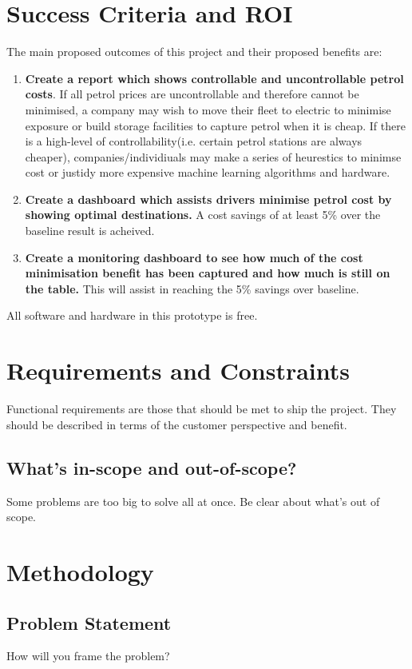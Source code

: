\documentclass[10pt]{article} %
\begin{document}
\section{Success Criteria and ROI}
The main proposed outcomes of this project and their proposed benefits are:
\begin{enumerate}
\item \textbf{Create a report which shows controllable and uncontrollable petrol costs}. If all petrol prices are uncontrollable and therefore cannot be minimised, a company may wish to move their fleet to electric to minimise exposure or build storage facilities to capture petrol when it is cheap. If there is a high-level of controllability(i.e. certain petrol stations are always cheaper), companies/individiuals may make a series of heurestics to minimse cost or justidy more expensive machine learning algorithms and hardware.
\item \textbf{Create a dashboard which assists drivers minimise petrol cost by showing optimal destinations.} A cost savings of at least 5\% over the baseline result is acheived.
\item \textbf{Create a monitoring dashboard to see how much of the cost minimisation benefit has been captured and how much is still on the table.} This will assist in reaching the 5\% savings over  baseline.
\end{enumerate}
All software and hardware in this prototype is free. 

\section{ Requirements and Constraints}
Functional requirements are those that should be met to ship the project. They should be described in terms of the customer perspective and benefit.
\subsection{What's in-scope and out-of-scope?}
Some problems are too big to solve all at once. Be clear about what's out of scope.

\section{Methodology}

\subsection{Problem Statement}
How will you frame the problem?
\end{document}
